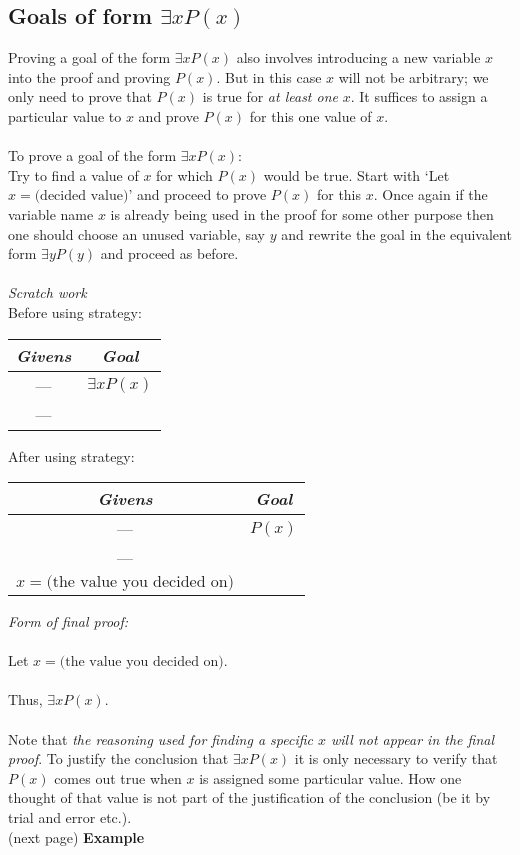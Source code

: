 \documentclass{report}
\begin{document}
\subsection{Goals of form $\exists xP(x)$}
Proving a goal of the form $\exists xP(x)$ also involves introducing a new variable $x$ into the proof and proving $P(x)$. But in this case $x$ will not be arbitrary; we only need to prove that 
$P(x)$ is true for \textit{at least one} $x$. It suffices to assign a particular value to $x$ and prove $P(x)$ for this one value of $x$.\\
\vspace{1mm}\\
\indent To prove a goal of the form $\exists xP(x)$:\\
\indent Try to find a value of $x$ for which $P(x)$ would be true. Start with `Let $x=\text{(decided value)}$' and proceed to prove $P(x)$ for this $x$. Once again if the variable name $x$ 
is already being used in the proof for some other purpose then one should choose an unused variable, say $y$ and rewrite the goal in the equivalent form $\exists yP(y)$ and proceed as before.\\
\vspace{1mm}\\
\textit{Scratch work}\\
Before using strategy:
\begin{center}
\begin{tabular}{c|c}
\textit{Givens}&\textit{Goal}\\
\hline
---&$\exists xP(x)$\\
---&
\end{tabular}
\end{center}
After using strategy:
\begin{center}
\begin{tabular}{c|c}
\textit{Givens}&\textit{Goal}\\
\hline
---&$P(x)$\\
---&\\
$x=\text{(the value you decided on)}$&
\end{tabular}
\end{center}
\textit{Form of final proof:}\\
\vspace{1mm}\\
\indent Let $x=\text{(the value you decided on)}$.\\
\indent{}\\
\indent Thus, $\exists xP(x)$.\\
\vspace{1mm}\\
Note that \textit{the reasoning used for finding a specific $x$ will not appear in the final proof}. To justify the conclusion that $\exists xP(x)$ it is only necessary to verify that $P(x)$ comes
out true when $x$ is assigned some particular value. How one thought of that value is not part of the justification of the conclusion (be it by trial and error etc.).\\
(next page)
\newpage
\noindent\textbf{Example}
\end{document}
